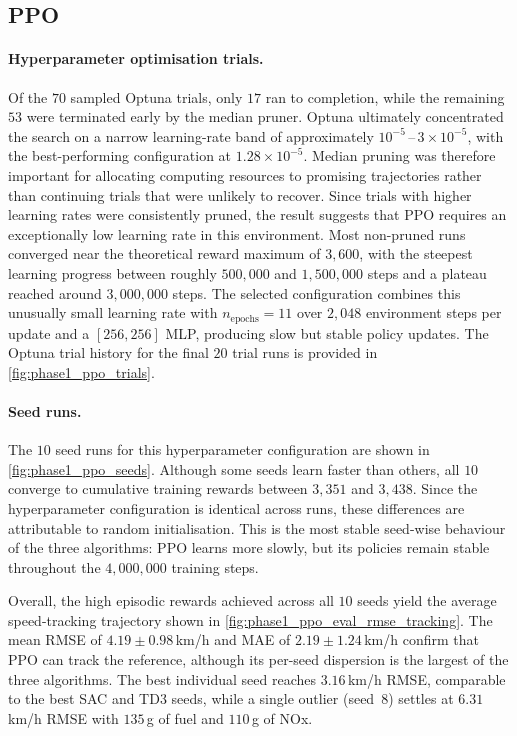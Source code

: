 \subsection{PPO}
\label{subsec:results_ppo}

\paragraph{Hyperparameter optimisation trials.}
Of the $70$ sampled Optuna trials, only $17$ ran to completion, while the remaining $53$ were terminated early by the median pruner. Optuna ultimately concentrated the search on a narrow learning-rate band of approximately $10^{-5}$\,--\,$3\times 10^{-5}$, with the best-performing configuration at $1.28 \times 10^{-5}$. Median pruning was therefore important for allocating computing resources to promising trajectories rather than continuing trials that were unlikely to recover. Since trials with higher learning rates were consistently pruned, the result suggests that PPO requires an exceptionally low learning rate in this environment. Most non-pruned runs converged near the theoretical reward maximum of $3{,}600$, with the steepest learning progress between roughly $500{,}000$ and $1{,}500{,}000$ steps and a plateau reached around $3{,}000{,}000$ steps. The selected configuration combines this unusually small learning rate with $n_{\text{epochs}} = 11$ over $2{,}048$ environment steps per update and a $[256, 256]$ \ac{MLP}, producing slow but stable policy updates. The Optuna trial history for the final $20$ trial runs is provided in \autoref{fig:phase1_ppo_trials}.

\paragraph{Seed runs.}
The $10$ seed runs for this hyperparameter configuration are shown in \autoref{fig:phase1_ppo_seeds}. Although some seeds learn faster than others, all $10$ converge to cumulative training rewards between $3{,}351$ and $3{,}438$. Since the hyperparameter configuration is identical across runs, these differences are attributable to random initialisation. This is the most stable seed-wise behaviour of the three algorithms: PPO learns more slowly, but its policies remain stable throughout the $4{,}000{,}000$ training steps.

Overall, the high episodic rewards achieved across all $10$ seeds yield the average speed-tracking trajectory shown in \autoref{fig:phase1_ppo_eval_rmse_tracking}. The mean \ac{RMSE} of $4.19 \pm 0.98$\,km/h and \ac{MAE} of $2.19 \pm 1.24$\,km/h confirm that PPO can track the reference, although its per-seed dispersion is the largest of the three algorithms. The best individual seed reaches $3.16$\,km/h \ac{RMSE}, comparable to the best SAC and TD3 seeds, while a single outlier (seed~8) settles at $6.31$\,km/h \ac{RMSE} with $135$\,g of fuel and $110$\,g of \ac{NOx}.

